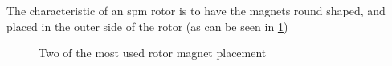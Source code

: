 The characteristic of an \gls{spm} rotor is to have the magnets round shaped, and placed in the outer side of the rotor (as can be seen in \cref{fig:rotor_magnet_placement})

\begin{figure}[H]
    \centering
  \caption{Two of the most used rotor magnet placement}
  \label{fig:rotor_magnet_placement}
\end{figure}

